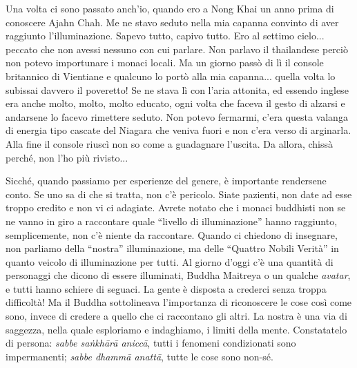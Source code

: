 Una volta ci sono passato anch'io, quando ero a Nong Khai un anno prima
di conoscere Ajahn Chah. Me ne stavo seduto nella mia capanna convinto
di aver raggiunto l'illuminazione. Sapevo tutto, capivo tutto. Ero al
settimo cielo... peccato che non avessi nessuno con cui parlare. Non
parlavo il thailandese perciò non potevo importunare i monaci locali. Ma
un giorno passò di lì il console britannico di Vientiane e qualcuno lo
portò alla mia capanna... quella volta lo subissai davvero il poveretto!
Se ne stava lì con l'aria attonita, ed essendo inglese era anche molto,
molto, molto educato, ogni volta che faceva il gesto di alzarsi e
andarsene lo facevo rimettere seduto. Non potevo fermarmi, c'era questa
valanga di energia tipo cascate del Niagara che veniva fuori e non c'era
verso di arginarla. Alla fine il console riuscì non so come a guadagnare
l'uscita. Da allora, chissà perché, non l'ho più rivisto...

Sicché, quando passiamo per esperienze del genere, è importante
rendersene conto. Se uno sa di che si tratta, non c'è pericolo. Siate
pazienti, non date ad esse troppo credito e non vi ci adagiate. Avrete
notato che i monaci buddhisti non se ne vanno in giro a raccontare quale
``livello di illuminazione'' hanno raggiunto, semplicemente, non c'è
niente da raccontare. Quando ci chiedono di insegnare, non parliamo
della ``nostra'' illuminazione, ma delle ``Quattro Nobili Verità'' in quanto
veicolo di illuminazione per tutti. Al giorno d'oggi c'è una quantità di
personaggi che dicono di essere illuminati, Buddha Maitreya o un qualche
\textit{avatar}, e tutti hanno schiere di seguaci. La gente è disposta a crederci
senza troppa difficoltà! Ma il Buddha sottolineava l'importanza di
riconoscere le cose così come sono, invece di credere a quello che ci
raccontano gli altri. La nostra è una via di saggezza, nella quale
esploriamo e indaghiamo, i limiti della mente. Constatatelo di persona:
\textit{sabbe saṅkhārā aniccā}, tutti i fenomeni condizionati sono impermanenti;
\textit{sabbe dhammā anattā}, tutte le cose sono non-sé.
